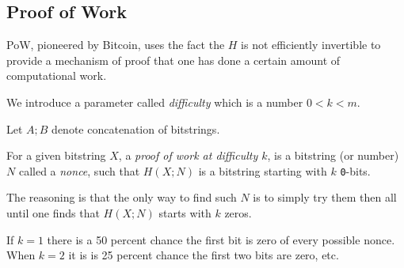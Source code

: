 \subsection{Proof of Work}
\label{PoW}

PoW, pioneered by Bitcoin, uses the fact the $H$ is not efficiently invertible to provide a mechanism of proof that one has done a certain amount of computational work.

We introduce a parameter called \emph{difficulty} which is a number $0 < k < m$.

Let $A;B$ denote concatenation of bitstrings.

For a given bitstring $X$, a \emph{proof of work at difficulty $k$},
is a bitstring (or number) $N$ called a \emph{nonce},
such that $H(X;N)$ is a bitstring starting with $k$ \texttt{0}-bits.

The reasoning is that the only way to find such $N$ is to simply try them then all until one finds that $H(X;N)$ starts with $k$ zeros.

If $k=1$ there is a 50 percent chance the first bit is zero of every possible nonce.
When $k=2$ it is is 25 percent chance the first two bits are zero, etc.



